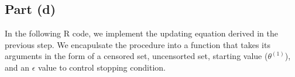 \documentclass[
]{article}
\begin{document}
\hypertarget{part-d}{%
\subsection{Part (d)}\label{part-d}}


In the following R code, we implement the updating equation derived in
the previous step. We encapulsate the procedure into a function that
takes its arguments in the form of a censored set, uncensorted set,
starting value (\(\theta^{(1)}\)), and an \(\epsilon\) value to control
stopping condition.
\end{document}
